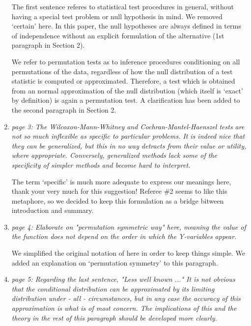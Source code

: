 \documentclass[11pt]{article}
\begin{document}
\begin{enumerate}
The first sentence referes to statistical test procedures in general,
without having a special test problem or null hypothesis in mind. We removed
`certain' here. In this paper, the null hypotheses are always defined in
terms of independence without an explicit formulation of the alternative
(1st paragraph in Section 2).

We refer to permutation tests as to inference procedures conditioning on all
permutations of the data, regardless of how the null distribution of a test
statistic is computed or approximated. Therefore, a test which is obtained
from an normal approximation of the null distribution (which itself is
`exact' by definition) is again a permutation test. A clarification has been
added to the second paragraph in Section 2.

\item \textsl{page 3:  The Wilcoxon-Mann-Whitney and Cochran-Mantel-Haenszel tests are not 
              so much inflexible as specific to particular problems. It is indeed nice that they 
              can be generalized, but this in no way detracts from their value or utility, where 
              appropriate. Conversely, generalized methods lack some of the specificity of 
              simpler methods and become hard to interpret.}

The term `specific' is much more adequate to express our meanings here,
thank your very much for this suggestion! Referee \#2 seems to like this
metaphore, so we decided to keep this formulation as a bridge bitween
introduction and summary. 

\item \textsl{page 4:  Elaborate on "permutation symmetric way" here, meaning the value of the 
              function does not depend on the order in which the Y-variables appear.}

We simplified the original notation of \cite{StrasserWeber1999} here in
order to keep things simple. We added an explanation on `permutation
symmetry' to this paragraph.

 
\item \label{asympt} \textsl{page 5:  Regarding the last sentence, "Less well known ..." It is not obvious that 
              the conditional distribution can be approximated by its limiting distribution 
              under - all - circumstances, but in any case the accuracy of this approximation 
              is what is of most concern. The implications of this and the theory in the rest of 
              this paragraph should be developed more clearly. }


\end{enumerate}
\end{document}
